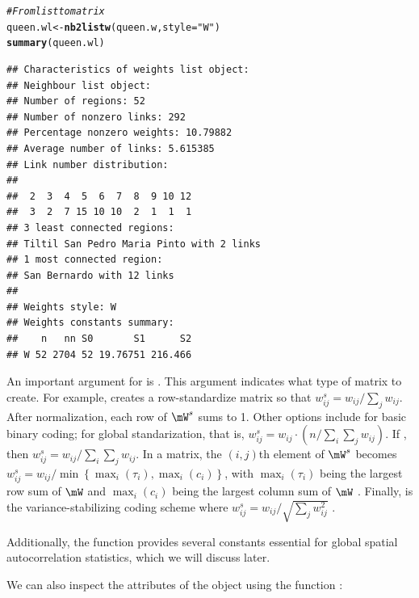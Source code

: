 \documentclass[english,12pt]{book}\usepackage[]{graphicx}\usepackage[]{xcolor}
\makeatletter
\newcommand{\hlstr}[1]{\textcolor[rgb]{0.192,0.494,0.8}{#1}}%
\newcommand{\hlcom}[1]{\textcolor[rgb]{0.678,0.584,0.686}{\textit{#1}}}%
\newcommand{\hlstd}[1]{\textcolor[rgb]{0.345,0.345,0.345}{#1}}%
\newcommand{\hlkwb}[1]{\textcolor[rgb]{0.69,0.353,0.396}{#1}}%
\newcommand{\hlkwc}[1]{\textcolor[rgb]{0.333,0.667,0.333}{#1}}%
\newcommand{\hlkwd}[1]{\textcolor[rgb]{0.737,0.353,0.396}{\textbf{#1}}}%
\newenvironment{kframe}{%
 \def\at@end@of@kframe{}%
 \ifinner\ifhmode%
  \def\at@end@of@kframe{\end{minipage}}%
  \begin{minipage}{\columnwidth}%
 \fi\fi%
 \def\FrameCommand##1{\hskip\@totalleftmargin \hskip-\fboxsep
 \colorbox{shadecolor}{##1}\hskip-\fboxsep
     \hskip-\linewidth \hskip-\@totalleftmargin \hskip\columnwidth}%
 \MakeFramed {\advance\hsize-\width
   \@totalleftmargin\z@ \linewidth\hsize
   \@setminipage}}%
 {\par\unskip\endMakeFramed%
 \at@end@of@kframe}
\newenvironment{knitrout}{}{} %
\makeatother
\begin{document}
\begin{knitrout}
\color{fgcolor}\begin{kframe}
\begin{alltt}
\hlcom{# From list to matrix}
\hlstd{queen.wl} \hlkwb{<-} \hlkwd{nb2listw}\hlstd{(queen.w,} \hlkwc{style} \hlstd{=} \hlstr{"W"}\hlstd{)}
\hlkwd{summary}\hlstd{(queen.wl)}
\end{alltt}
\begin{verbatim}
## Characteristics of weights list object:
## Neighbour list object:
## Number of regions: 52 
## Number of nonzero links: 292 
## Percentage nonzero weights: 10.79882 
## Average number of links: 5.615385 
## Link number distribution:
## 
##  2  3  4  5  6  7  8  9 10 12 
##  3  2  7 15 10 10  2  1  1  1 
## 3 least connected regions:
## Tiltil San Pedro Maria Pinto with 2 links
## 1 most connected region:
## San Bernardo with 12 links
## 
## Weights style: W 
## Weights constants summary:
##    n   nn S0       S1      S2
## W 52 2704 52 19.76751 216.466
\end{verbatim}
\end{kframe}
\end{knitrout}

An important argument for  is . This argument indicates what type of matrix to create. For example,  creates a row-standardize matrix so that $w^s_{ij} = w_{ij}/ \sum_j w_{ij}$. After normalization, each row of $\mW^s$ sums to 1. Other options include  for basic binary coding;  for global standarization, that is, $w^s_{ij} = w_{ij} \cdot (n/ \sum_{i}\sum_j w_{ij})$. If , then $w^s_{ij} = w_{ij}/ \sum_i\sum_j w_{ij}$. In a  matrix, the $(i,j)$th element of $\mW^s$  becomes $w^s_{ij} = w_{ij} / \min\left\lbrace \max_i(\tau_i), \max_i(c_i)\right\rbrace$, with $\max_i(\tau_i)$ being the largest row sum of $\mW$ and $\max_i(c_i)$ being the largest column sum of $\mW$ \citep{kelejian2010specification}. Finally,  is the variance-stabilizing coding scheme where $w^s_{ij} = w_{ij}/ \sqrt{\sum_j w_{ij} ^2}$ \citep{tiefelsdorf1999variance}. 

Additionally, the  function provides several constants essential for global spatial autocorrelation statistics, which we will discuss later. 

We can also inspect the attributes of the object using the function :
\end{document}
